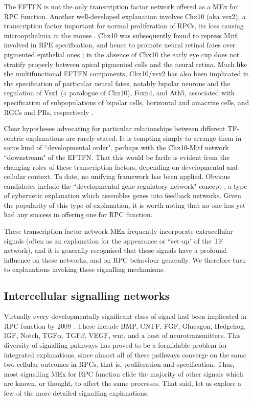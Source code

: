 The EFTFN is not the only transcription factor network offered as a MEx for RPC function. Another well-developed explanation involves Chx10 (aka vsx2), a transcription factor important for normal proliferation of RPCs, its loss causing microopthalmia in the mouse \cite{Burmeister1996}. Chx10 was subsequently found to repress Mitf, involved in RPE specification, and hence to promote neural retinal fates over pigmented epithelial ones \cite{Horsford2004}; in the absence of Chx10 the early eye cup does not stratify properly between apical pigmented cells and the neural retina. Much like the multifunctional EFTFN components, Chx10/vsx2 has also been implicated in the specification of particular neural fates, notably bipolar neurons \cite{Burmeister1996} and the regulation of Vsx1 (a paralogue of Chx10), Foxn4, and Ath5, associated with specification of subpopulations of bipolar cells, horizontal and amacrine cells, and RGCs and PRs, respectively \cite{Clark2008,Vitorino2009}.

Clear hypotheses advocating for particular relationships between different TF-centric explanations are rarely stated. It is tempting simply to arrange them in some kind of ``developmental order", perhaps with the Chx10-Mitf network ``downstream" of the EFTFN. That this would be facile is evident from the changing roles of these transcription factors, depending on developmental and cellular context. To date, no unifying framework has been applied. Obvious candidates include the ``developmental gene regulatory network" concept \cite{Li2009}, a type of cybernetic explanation which assembles genes into feedback networks. Given the popularity of this type of explanation, it is worth noting that no one has yet had any success in offering one for RPC function.

These transcription factor network MEx frequently incorporate extracellular signals (often as an explanation for the appearance or ``set-up" of the TF network), and it is generally recognised that these signals have a profound influence on these networks, and on RPC behaviour generally. We therefore turn to explanations invoking these signalling mechanisms.

\subsection{Intercellular signalling networks}

Virtually every developmentally significant class of signal had been implicated in RPC function by 2009 \cite{Agathocleous2009}. These include BMP, CNTF, FGF, Glucagon, Hedgehog, IGF, Notch, TGF$\alpha$, TGF$\beta$, VEGF, wnt, and a host of neurotransmitters. This diversity of signalling pathways has proved to be a formidable problem for integrated explanations, since almost all of these pathways converge on the same two cellular outcomes in RPCs, that is, proliferation and specification. Thus, most signalling MEx for RPC function elide the majority of other signals which are known, or thought, to affect the same processes. That said, let us explore a few of the more detailed signalling explanations.

